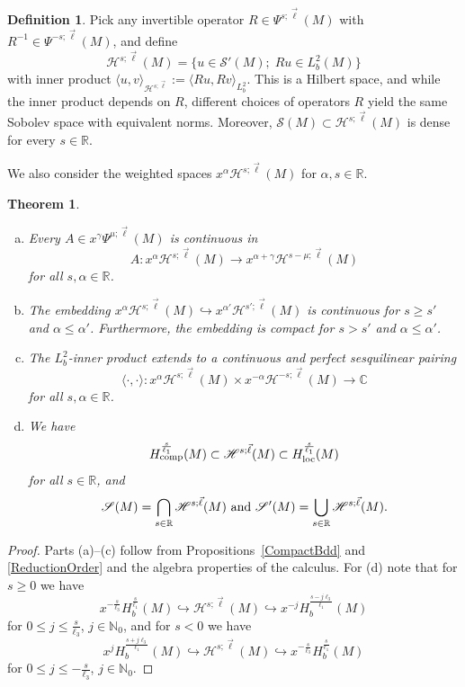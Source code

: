 \documentclass[reqno]{amsart}
\numberwithin{equation}{section}
\newtheorem{theorem}[equation]{Theorem}
\theoremstyle{definition}
\newtheorem{definition}[equation]{Definition}
\def\C{\mathbb C}
\def\N{\mathbb N}
\def\R{\mathbb R}
\def\S{\mathscr S}
\begin{document}
\begin{definition}
Pick any invertible operator $R \in \Psi^{s;\vec{\ell}}(M)$ with $R^{-1} \in \Psi^{-s;\vec{\ell}}(M)$, and define
$$
{\mathscr H}^{s;\vec{\ell}}(M) = \{u \in \S'(M);\; Ru \in L^2_b(M)\}
$$
with inner product $\langle u,v \rangle_{{\mathscr H}^{s;\vec{\ell}}}:= \langle Ru,Rv \rangle_{L^2_b}$. This is a Hilbert space, and while the inner product depends on $R$, different choices of operators $R$ yield the same Sobolev space with equivalent norms. Moreover, $\S(M) \subset {\mathscr H}^{s;\vec{\ell}}(M)$ is dense for every $s \in \R$.

We also consider the weighted spaces $x^{\alpha}{\mathscr H}^{s;\vec{\ell}}(M)$ for $\alpha,s \in \R$.
\end{definition}

\begin{theorem}\label{SobolevSpaceProperties}
\begin{enumerate}[(a)]
\item Every $A \in x^{\gamma}\Psi^{\mu;\vec{\ell}}(M)$ is continuous in
$$
A : x^{\alpha}{\mathscr H}^{s;\vec{\ell}}(M) \to x^{\alpha+\gamma}{\mathscr H}^{s-\mu;\vec{\ell}}(M) 
$$
for all $s,\alpha \in \R$.
\item The embedding $x^{\alpha}{\mathscr H}^{s;\vec{\ell}}(M) \hookrightarrow x^{\alpha'}{\mathscr H}^{s';\vec{\ell}}(M)$ is continuous for $s \geq s'$ and $\alpha \leq \alpha'$. Furthermore, the embedding is compact for $s > s'$ and $\alpha \leq \alpha'$.
\item The $L^2_b$-inner product extends to a continuous and perfect sesquilinear pairing
$$
\langle \cdot,\cdot \rangle : x^{\alpha}{\mathscr H}^{s;\vec{\ell}}(M) \times x^{-\alpha}{\mathscr H}^{-s;\vec{\ell}}(M) \to \C
$$
for all $s,\alpha \in \R$.
\item We have
$$
H^{\frac{s}{\ell_1}}_{\textup{comp}}(M) \subset {\mathscr H}^{s;\vec{\ell}}(M)  \subset H^{\frac{s}{\ell_1}}_{\textup{loc}}(M) 
$$
for all $s \in \R$, and
$$
\S(M) = \bigcap\limits_{s \in \R}{\mathscr H}^{s;\vec{\ell}}(M) \textup{ and } \S'(M) = \bigcup\limits_{s \in \R}{\mathscr H}^{s;\vec{\ell}}(M).
$$
\end{enumerate}
\end{theorem}
\begin{proof}
Parts (a)--(c) follow from Propositions~\ref{CompactBdd} and \ref{ReductionOrder} and the algebra properties of the calculus. For (d) note that for $s \geq 0$ we have
$$
x^{-\frac{s}{\ell_3}}H^{\frac{s}{\ell_1}}_b(M) \hookrightarrow {\mathscr H}^{s;\vec{\ell}}(M) \hookrightarrow x^{-j}H^{\frac{s-j\ell_3}{\ell_1}}_b(M)
$$
for $0 \leq j \leq \frac{s}{\ell_3}$, $j \in \N_0$, and for $s < 0$ we have
$$
x^{j}H^{\frac{s+j\ell_3}{\ell_1}}_b(M) \hookrightarrow {\mathscr H}^{s;\vec{\ell}}(M) \hookrightarrow x^{-\frac{s}{\ell_3}}H^{\frac{s}{\ell_1}}_b(M)
$$
for $0 \leq j \leq -\frac{s}{\ell_3}$, $j \in \N_0$.
\end{proof}
\end{document}
